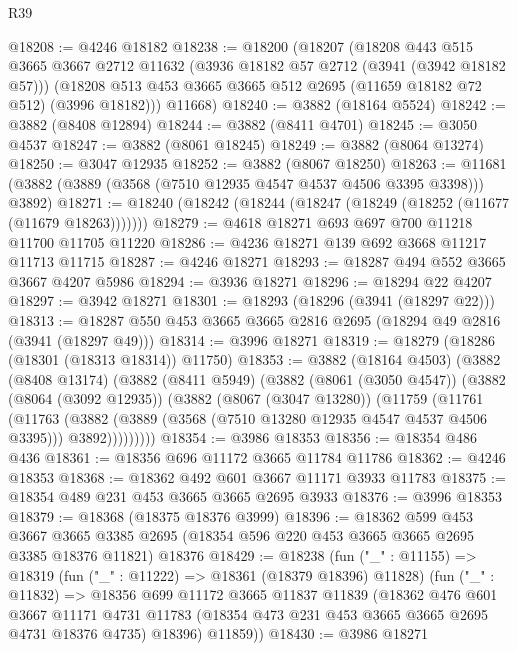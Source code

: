 \begin{lexlean}{R39}
\begin{coremodule}
@18208 := @4246 @18182
@18238 := @18200
    (@18207
      (@18208
        @443
        @515
        @3665
        @3667
        @2712
        @11632
        (@3936 @18182 @57 @2712 (@3941 (@3942 @18182 @57)))
        (@18208 @513 @453 @3665 @3665 @512 @2695 (@11659 @18182 @72 @512) (@3996 @18182)))
      @11668)
@18240 := @3882 (@18164 @5524)
@18242 := @3882 (@8408 @12894)
@18244 := @3882 (@8411 @4701)
@18245 := @3050 @4537
@18247 := @3882 (@8061 @18245)
@18249 := @3882 (@8064 @13274)
@18250 := @3047 @12935
@18252 := @3882 (@8067 @18250)
@18263 := @11681 (@3882 (@3889 (@3568 (@7510 @12935 @4547 @4537 @4506 @3395 @3398))) @3892)
@18271 := @18240 (@18242 (@18244 (@18247 (@18249 (@18252 (@11677 (@11679 @18263)))))))
@18279 := @4618 @18271 @693 @697 @700 @11218 @11700 @11705 @11220
@18286 := @4236 @18271 @139 @692 @3668 @11217 @11713 @11715
@18287 := @4246 @18271
@18293 := @18287 @494 @552 @3665 @3667 @4207 @5986
@18294 := @3936 @18271
@18296 := @18294 @22 @4207
@18297 := @3942 @18271
@18301 := @18293 (@18296 (@3941 (@18297 @22)))
@18313 := @18287 @550 @453 @3665 @3665 @2816 @2695 (@18294 @49 @2816 (@3941 (@18297 @49)))
@18314 := @3996 @18271
@18319 := @18279 (@18286 (@18301 (@18313 @18314)) @11750)
@18353 := @3882
    (@18164 @4503)
    (@3882
      (@8408 @13174)
      (@3882
        (@8411 @5949)
        (@3882
          (@8061 (@3050 @4547))
          (@3882
            (@8064 (@3092 @12935))
            (@3882
              (@8067 (@3047 @13280))
              (@11759
                (@11761
                  (@11763
                    (@3882
                      (@3889 (@3568 (@7510 @13280 @12935 @4547 @4537 @4506 @3395)))
                      @3892)))))))))
@18354 := @3986 @18353
@18356 := @18354 @486 @436
@18361 := @18356 @696 @11172 @3665 @11784 @11786
@18362 := @4246 @18353
@18368 := @18362 @492 @601 @3667 @11171 @3933 @11783
@18375 := @18354 @489 @231 @453 @3665 @3665 @2695 @3933
@18376 := @3996 @18353
@18379 := @18368 (@18375 @18376 @3999)
@18396 := @18362
    @599
    @453
    @3667
    @3665
    @3385
    @2695
    (@18354 @596 @220 @453 @3665 @3665 @2695 @3385 @18376 @11821)
    @18376
@18429 := @18238
    (fun ("_" : @11155) =>
    @18319
      (fun ("_" : @11222) => @18361 (@18379 @18396) @11828)
      (fun ("_" : @11832) =>
      @18356
        @699
        @11172
        @3665
        @11837
        @11839
        (@18362
          @476
          @601
          @3667
          @11171
          @4731
          @11783
          (@18354 @473 @231 @453 @3665 @3665 @2695 @4731 @18376 @4735)
          @18396)
        @11859))
@18430 := @3986 @18271

\end{coremodule}
\end{lexlean}
